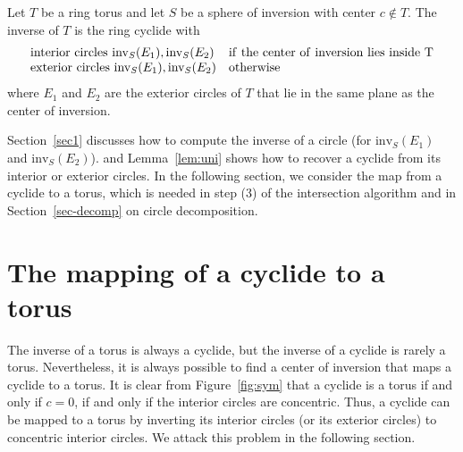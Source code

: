 \ifFull
\else
\newpage
\fi

\begin{theorem}
\label{thm:invtorus}
Let $T$ be a ring torus and let
$S$ be a sphere of inversion with center $c \not \in T$.
The inverse of $T$ is the ring cyclide with 
\[ \begin{array}{ll}
   {\rm interior\ circles\ } \mbox{inv}_S(E_1), \mbox{inv}_S(E_2) &
		\rm{if\ the\ center\ of\ inversion\ lies\ inside\ } T \\
   {\rm exterior\ circles\ } \mbox{inv}_S(E_1), \mbox{inv}_S(E_2) &
			\rm{otherwise}
   \end{array}
\]
where $E_1$ and $E_2$ are the exterior circles of $T$
that lie in the same plane as the center of inversion.
\end{theorem}

Section~\ref{sec1} discusses how to compute the inverse of a circle
(for $\mbox{inv}_S(E_1)$ and $\mbox{inv}_S(E_2)$).
and Lemma~\ref{lem:uni} shows how to recover a cyclide from its interior or
exterior circles.
In the following section, 
we consider the map from a cyclide to a torus, which
is needed in step (3) of the intersection algorithm and in 
Section~\ref{sec-decomp} on circle decomposition.


% 

\section{The mapping of a cyclide to a torus}
\label{sec:totorus}

The inverse of a torus is always a cyclide, but the inverse of a cyclide
is rarely a torus.
Nevertheless, it is always possible to find a center of inversion that maps
a cyclide to a torus.
It is clear from Figure~\ref{fig:sym} that a cyclide is a torus if and only
if $c=0$, if and only if the interior circles are concentric.
Thus, a cyclide can be mapped to a torus by
inverting its interior circles (or its exterior circles) 
to concentric interior circles.
We attack this problem in the following section.

